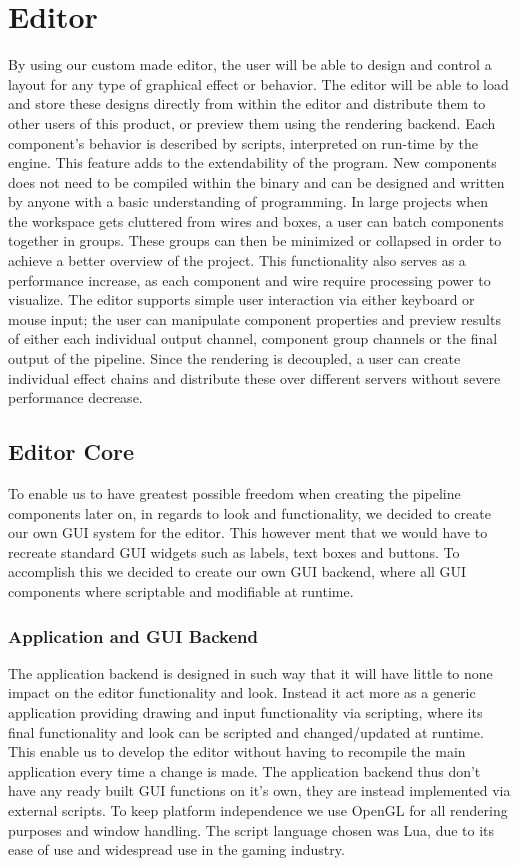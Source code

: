 
\chapter{Editor}
 
By using our custom made editor, the user will be able to design and control a layout for any type of graphical effect or behavior. The editor will be able to load and store these designs directly from within the editor and distribute them to other users of this product, or preview them using the rendering backend. 
Each component’s behavior is described by scripts, interpreted on run-time by the engine. This feature adds to the extendability of the program. New components does not need to be compiled within the binary and can be designed and written by anyone with a basic understanding of programming.
In large projects when the workspace gets cluttered from wires and boxes, a user can batch components together in groups. These groups can then be minimized or collapsed in order to achieve a better overview of the project. This functionality also serves as a performance increase, as each component and wire require processing power to visualize. 
The editor supports simple user interaction via either keyboard or mouse input; the user can manipulate component properties and preview results of either each individual output channel, component group channels or the final output of the pipeline. Since the rendering is decoupled, a user can create individual effect chains and distribute these over different servers without severe performance decrease. 

\section{Editor Core}
To enable us to have greatest possible freedom when creating the pipeline components later on, in regards to look and functionality, we decided to create our own GUI system for the editor. This however ment that we would have to recreate standard GUI widgets such as labels, text boxes and buttons. To accomplish this we decided to create our own GUI backend, where all GUI components where scriptable and modifiable at runtime.

\subsection{Application and GUI Backend}
The application backend is designed in such way that it will have little to none impact on the editor functionality and look. Instead it act more as a generic application providing drawing and input functionality via scripting, where its final functionality and look can be scripted and changed/updated at runtime. This enable us to develop the editor without having to recompile the main application every time a change is made. The application backend thus don't have any ready built GUI functions on it's own, they are instead implemented via external scripts. To keep platform independence we use OpenGL for all rendering purposes and window handling. The script language chosen was Lua, due to its ease of use and widespread use in the gaming industry.

